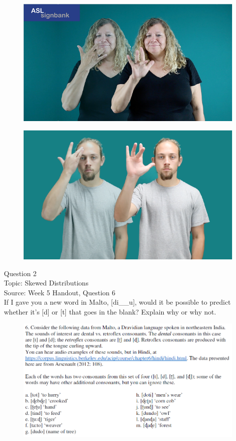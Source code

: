 \documentclass[12pt]{article}
\begin{document}
\begin{figure}[H]
\includegraphics{../images/asl_lucky.png}
\end{figure}
\begin{figure}[H]
\includegraphics{../images/asl_smart.png}
\end{figure}

\newpage

{\large Question 2}\\

Topic: Skewed Distributions\\
Source: Week 5 Handout, Question 6\\

If I gave you a new word in Malto, [di\_\_u], would it be possible to predict whether it's [d] or [t] that goes in the blank? Explain why or why not.\\

\begin{figure}[H]
\includegraphics{../images/malto.png}
\end{figure}
\end{document}
